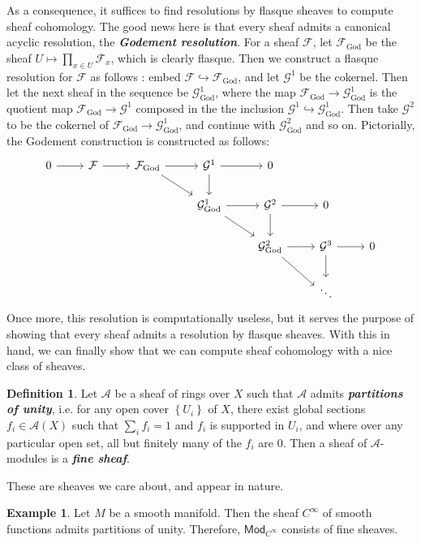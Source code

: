 \documentclass[psamsfonts, 12pt]{amsart}
\theoremstyle{definition}
\newtheorem{defn}[thm]{Definition}
\newtheorem{exmp}[thm]{Example}
\theoremstyle{remark}
\newcommand{\ib}[1]{\textbf{\textit{#1}}}
\newcommand{\set}[1]{\left\lbrace #1 \right\rbrace}
\begin{document}
%
As a consequence, it suffices to find resolutions by flasque sheaves to compute sheaf
cohomology. The good news here is that every sheaf admits a canonical
acyclic resolution, the \ib{Godement resolution}. For a sheaf $\mathcal{F}$,
let $\mathcal{F}_{\mathrm{God}}$ be the sheaf $U \mapsto \prod_{x \in U}\mathcal{F}_x$,
which is clearly flasque. Then we construct a flasque resolution for
$\mathcal{F}$ as follows : embed
$\mathcal{F} \hookrightarrow \mathcal{F}_{\mathrm{God}}$, and let $\mathcal{G}^1$ be
the cokernel. Then let the next sheaf in the sequence be $\mathcal{G}^1_{\mathrm{God}}$,
where the map $\mathcal{F}_{\mathrm{God}} \to \mathcal{G}^1_{\mathrm{God}}$ is the
quotient map $\mathcal{F}_{\mathrm{God}} \to \mathcal{G}^1$ composed in the the inclusion
$\mathcal{G}^1 \hookrightarrow \mathcal{G}^1_{\mathrm{God}}$. Then take $\mathcal{G}^2$
to be the cokernel of $\mathcal{F}_{\mathrm{God}} \to \mathcal{G}^1_{\mathrm{God}}$,
and continue with $\mathcal{G}^2_{\mathrm{God}}$ and so on. Pictorially, the
Godement construction is constructed as follows:
\[\begin{tikzcd}
0 \ar[r] & \mathcal{F} \ar[r] & \mathcal{F}_{\mathrm{God}} \ar[dr] \ar[r]
& \mathcal{G}^1 \ar[r] \ar[d] & 0 \\
& & & \mathcal{G}^1_{\mathrm{God}} \ar[r] \ar[dr] & \mathcal{G}^2 \ar[r] \ar[d] & 0\\
& & & & \mathcal{G}^2_{\mathrm{God}} \ar[r] \ar[dr] & \mathcal{G}^3 \ar[r] \ar[d] & 0 \\
& & & & & \ddots
\end{tikzcd}\]
%
Once more, this resolution is computationally useless, but it serves the purpose of
showing that every sheaf admits a resolution by flasque sheaves. With this in hand,
we can finally show that we can compute sheaf cohomology with a nice class of sheaves.
%
\begin{defn}
Let $\mathcal{A}$ be a sheaf of rings over $X$ such that $\mathcal{A}$ admits
\ib{partitions of unity}, i.e. for any open cover $\set{U_i}$ of $X$, there exist global
sections $f_i \in \mathcal{A}(X)$ such that $\sum_i f_i = 1$ and $f_i$ is supported
in $U_i$, and where over any particular open set, all but finitely many of the $f_i$
are $0$. Then a sheaf of $\mathcal{A}$-modules is a \ib{fine sheaf}.
\end{defn}
%
These are sheaves we care about, and appear in nature.
%
\begin{exmp}
Let $M$ be a smooth manifold. Then the sheaf $C^\infty$ of smooth functions
admits partitions of unity. Therefore, $\mathsf{Mod}_{C^\infty}$ consists of fine
sheaves.
\end{exmp}
\end{document}
